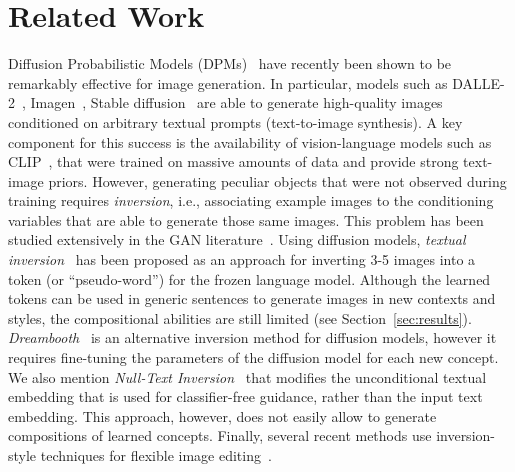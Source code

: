 \section{Related Work}
Diffusion Probabilistic Models (DPMs)~\cite{ddmps-sohl-dickstein15,ddpm} have recently been shown to be remarkably effective for image generation. In particular, models such as DALLE-2~\cite{rameshHierarchicalTextConditionalImage2022}, Imagen~\cite{sahariaPhotorealisticTexttoImageDiffusion2022}, Stable diffusion~\cite{stable_diffusion_Rombach_21} are able to generate high-quality images conditioned on arbitrary textual prompts (text-to-image synthesis). A key component for this success is the availability of vision-language models such as CLIP~\cite{radfordLearningTransferableVisual2021}, that were trained on massive amounts of data and provide strong text-image priors. However, generating peculiar objects that were not observed during training requires \emph{inversion}, i.e., associating example images to the conditioning variables that are able to generate those same images. This problem has been studied extensively in the GAN literature~\cite{creswellInvertingGeneratorGenerative2016,liptonPreciseRecoveryLatent2017,abdalImage2StyleGANHowEmbed2019}. Using diffusion models, \emph{textual inversion}~\cite{textinversion} has been proposed as an approach for inverting 3-5 images into a token (or ``pseudo-word'') for the frozen language model. Although the learned tokens can be used in generic sentences to generate images in new contexts and styles, the compositional abilities are still limited (see Section~\ref{sec:results}). \emph{Dreambooth}~\cite{ruizDreamBoothFineTuning2022} is an alternative inversion method for diffusion models, however it requires fine-tuning the parameters of the diffusion model for each new concept. We also mention \emph{Null-Text Inversion}~\cite{mokadyNulltextInversionEditing2022} that modifies the unconditional textual embedding that is used for classifier-free guidance, rather than the input text embedding. This approach, however, does not easily allow to generate compositions of learned concepts. Finally, several recent methods use inversion-style techniques for flexible image editing~\cite{mokadyNulltextInversionEditing2022, dongPromptTuningInversion2023}.

